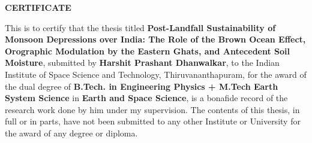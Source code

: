 \begin{dedication}
  \makeatletter
  \def\vhrulefill#1{\leavevmode\leaders\hrule\@height#1\hfill \kern\z@}
  \makeatother
  \vspace*{-1.5in}
  \begin{center}
    \textbf{{\large CERTIFICATE}}
  \end{center}
  \vspace*{0.5in}
  \noindent This is to certify that the thesis titled {\bf
    Post-Landfall Sustainability of Monsoon Depressions over India: The
    Role of the Brown Ocean Effect, Orographic Modulation by the
  Eastern Ghats, and Antecedent Soil Moisture}, submitted by {\bf
  Harshit Prashant Dhanwalkar}, to the Indian Institute of Space
  Science and Technology, Thiruvananthapuram, for the award of the
  dual degree of {\bf B.Tech. in Engineering Physics + M.Tech Earth
  System Science} in {\bf Earth and Space Science}, is a bonafide
  record of the research work done by him under my supervision. The
  contents of this thesis, in full or in parts, have not been
  submitted to any other Institute or University for the award of any
  degree or diploma.

  \vspace*{1.2in}
  \noindent



\end{dedication}

